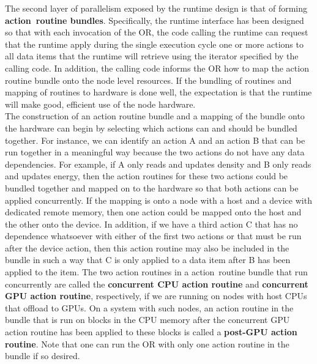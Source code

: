 \documentclass{article}
\newcommand{\shortOR}   {OR\xspace}
\newcommand{\OR}        {\shortOR}
\newcommand{\qsaa}                   {action\ }                 %
\newcommand{\actionroutinebundle}  {\qsaa routine bundle\xspace}  %
\newcommand{\actionroutinebundles} {\qsaa routine bundles\xspace} %
\newcommand{\actionroutine}        {action routine\xspace}       %
\newcommand{\actionroutines}       {action routines\xspace}
\begin{document}
The second layer of parallelism exposed by the runtime design is that of forming
\textbf{\actionroutinebundles}.  Specifically, the runtime interface has been
designed so that with each invocation of the \OR, the code calling the runtime
can request that the runtime apply during the single execution cycle one or more
actions to all data items that the runtime will retrieve using the iterator
specified by the calling code.  In addition, the calling code informs
the \OR how to map the action routine bundle onto the node level resources.  If
the bundling of routines and mapping of routines to hardware is done well, the
expectation is that the runtime will make good, efficient use of the node
hardware.\\

The construction of an action routine bundle and a mapping of the bundle onto the
hardware can begin by selecting which actions can and should be bundled
together.  For instance, we can identify an action A and an action B that can be
run together in a meaningful way because the two actions do not have any data
dependencies.  For example, if A only reads and updates density and
B only reads and updates energy, then the action routines for these two
actions could be bundled together and mapped on to the hardware so that both
actions can be applied concurrently.  If the mapping is onto a node with a host
and a device with dedicated remote memory, then one action could be mapped onto
the host and the other onto the device.  In
addition, if we have a third action C that has no dependence whatsoever with either
of the first two actions or that must be run after the device action, then this
action routine may also be included in the bundle in such a way that C is only
applied to a data item after B has been applied to the item.
The two \actionroutines in a \actionroutinebundle that run concurrently
are called the \textbf{concurrent CPU \actionroutine} and \textbf{concurrent GPU \actionroutine}, respectively, if we are
running on nodes with host CPUs that offload to GPUs.  On a system with such nodes, an
\actionroutine in the bundle that is run on blocks in the CPU memory after the concurrent
GPU \actionroutine has been applied to these blocks is called a \textbf{post-GPU
\actionroutine}.  Note that one can run the \OR with only one \actionroutine in the bundle
if so desired.\\
\end{document}
